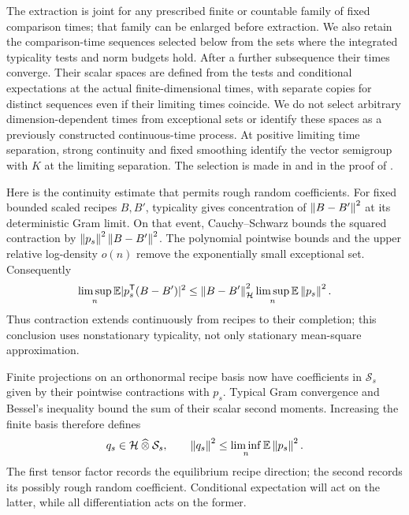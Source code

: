 The extraction is joint for any prescribed finite or countable family
of fixed comparison times; that family can be enlarged before extraction.
We also retain the comparison-time sequences selected below from the
sets where the integrated typicality tests and norm budgets hold.
After a further subsequence their times converge.  Their scalar spaces
are defined from the tests and conditional expectations at the actual
finite-dimensional times, with separate copies for distinct sequences
even if their limiting times coincide.  We do not select arbitrary
dimension-dependent times from exceptional sets or identify these spaces
as a previously constructed continuous-time process.  At positive limiting
time separation, strong continuity and fixed smoothing identify the
vector semigroup with $K$ at the limiting separation.  The selection is
made in  and in the proof of
.

Here is the continuity estimate that permits rough random coefficients.
For fixed bounded scaled recipes $B,B'$, typicality gives concentration
of $\left\lVert B-B'\right\rVert^2$ at its deterministic Gram limit.  On that event,
Cauchy--Schwarz bounds the squared contraction by
$\left\lVert p_s\right\rVert^2\left\lVert B-B'\right\rVert^2$.  The polynomial pointwise bounds and the
upper relative log-density $o(n)$ remove the exponentially small
exceptional set.  Consequently
\begin{equation}\label{eq:exact-contraction-continuity}
 \limsup_n\mathbb E|p_s^{\mathsf T}(B-B')|^2
 \le\left\lVert B-B'\right\rVert_{\mathcal H}^2
                   \limsup_n\mathbb E\left\lVert p_s\right\rVert^2.
\end{equation}
Thus contraction extends continuously from recipes to their completion;
this conclusion uses nonstationary typicality, not only stationary
mean-square approximation.

Finite projections on an orthonormal recipe basis now have coefficients
in $\mathcal S_s$ given by their pointwise contractions with $p_s$.
Typical Gram convergence and Bessel's inequality bound the sum of their
scalar second moments.  Increasing the finite basis therefore defines
\[
 q_s\in\mathcal H\mathbin{\widehat\otimes}\mathcal S_s,
 \qquad \left\lVert q_s\right\rVert^2\le\liminf_n\mathbb E\left\lVert p_s\right\rVert^2.
\]
The first tensor factor records the equilibrium recipe direction; the
second records its possibly rough random coefficient.  Conditional
expectation will act on the latter, while all differentiation acts on the
former.

